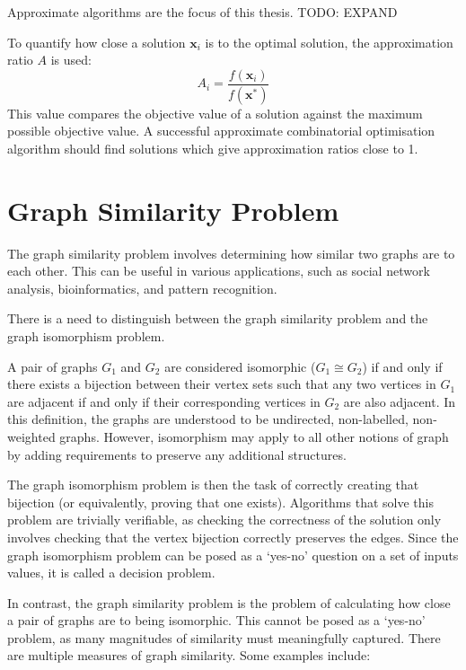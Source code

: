Approximate algorithms are the focus of this thesis. TODO: EXPAND

To quantify how close a solution $\mathbf{x}_i$ is to the optimal solution, the approximation ratio $A$ is used:
$$A_i = \frac{f(\mathbf{x}_i)}{f(\mathbf{x}^*)}$$
This value compares the objective value of a solution against the maximum possible objective value. A successful approximate combinatorial optimisation algorithm should find solutions which give approximation ratios close to 1.

\section{Graph Similarity Problem}\label{graph_sim_section}
The graph similarity problem involves determining how similar two graphs are to each other. This can be useful in various applications, such as social network analysis, bioinformatics, and pattern recognition. 

There is a need to distinguish between the graph similarity problem and the graph isomorphism problem.

A pair of graphs $G_1$ and $G_2$ are considered isomorphic ($G_1\cong G_2$) if and only if there exists a bijection between their vertex sets such that any two vertices in $G_1$ are adjacent if and only if their corresponding vertices in $G_2$ are also adjacent. In this definition, the graphs are understood to be undirected, non-labelled, non-weighted graphs. However, isomorphism may apply to all other notions of graph by adding requirements to preserve any additional structures.

The graph isomorphism problem is then the task of correctly creating that bijection (or equivalently, proving that one exists). Algorithms that solve this problem are trivially verifiable, as checking the correctness of the solution only involves checking that the vertex bijection correctly preserves the edges. Since the graph isomorphism problem can be posed as a `yes-no' question on a set of inputs values, it is called a decision problem.

In contrast, the graph similarity problem is the problem of calculating how close a pair of graphs are to being isomorphic. This cannot be posed as a `yes-no' problem, as many magnitudes of similarity must meaningfully captured. There are multiple measures of graph similarity. Some examples include:


